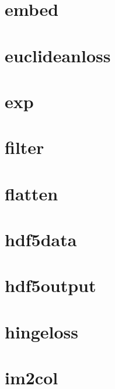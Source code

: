 \documentclass[twoside]{book}
\newcommand{\+}{\discretionary{\mbox{\scriptsize$\hookleftarrow$}}{}{}}
\begin{document}
\chapter{embed}
\label{md_docs_tutorial_layers_embed}

\chapter{euclideanloss}
\label{md_docs_tutorial_layers_euclideanloss}

\chapter{exp}
\label{md_docs_tutorial_layers_exp}

\chapter{filter}
\label{md_docs_tutorial_layers_filter}

\chapter{flatten}
\label{md_docs_tutorial_layers_flatten}

\chapter{hdf5data}
\label{md_docs_tutorial_layers_hdf5data}

\chapter{hdf5output}
\label{md_docs_tutorial_layers_hdf5output}

\chapter{hingeloss}
\label{md_docs_tutorial_layers_hingeloss}

\chapter{im2col}
\label{md_docs_tutorial_layers_im2col}

\end{document}
